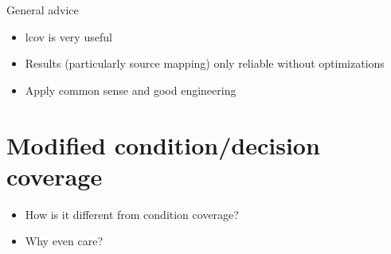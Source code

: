 \documentclass[xcolor = {dvipsnames, table}, aspectratio=169]{beamer}
\begin{document}
\begin{frame}
    \begin{block}{General advice}
        \begin{itemize}
            \item lcov is very useful
            \item Results (particularly source mapping) only reliable without
                optimizations
            \item Apply common sense and good engineering
        \end{itemize}
    \end{block}
\end{frame}

\section{Modified condition/decision coverage}

\begin{frame}
    \begin{itemize}
        \item How is it different from condition coverage?
        \item Why even care?
    \end{itemize}
\end{frame}
\end{document}
